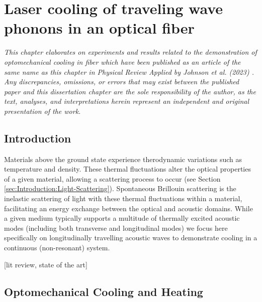 \setcounter{rownumber}{0}
\chapter{Laser cooling of traveling wave phonons in an optical fiber}
\label{ch:Cooling}
\acresetall

\textit{This chapter elaborates on experiments and results related to the demonstration of optomechanical cooling in fiber which have been published as an article of the same name as this chapter in Physical Review Applied by Johnson et al. (2023) \cite{johnson2023laser}. Any discrepancies, omissions, or errors that may exist between the published paper and this dissertation chapter are the sole responsibility of the author, as the text, analyses, and interpretations herein represent an independent and original presentation of the work.}


\section{Introduction}
\label{sec:Cooling:Introduction}

Materials above the ground state experience therodynamic variations such as temperature and density. These thermal fluctuations alter the optical properties of a given material, allowing a scattering process to occur (see Section \ref{sec:Introduction:Light-Scattering}). Spontaneous Brillouin scattering is the inelastic scattering of light with these thermal fluctuations within a material, facilitating an energy exchange between the optical and acoustic domains. While a given medium typically supports a multitude of thermally excited acoustic modes (including both transverse and longitudinal modes) we focus here specifically on longitudinally travelling acoustic waves to demonstrate cooling in a continuous (non-resonant) system.

[lit review, state of the art]


\section{Optomechanical Cooling and Heating}
\label{sec:Cooling:Cooling-Heating}

